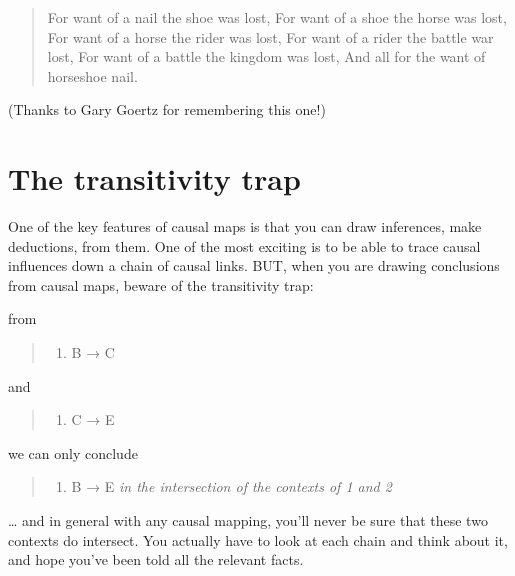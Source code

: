 \documentclass[
]{book}
\providecommand{\tightlist}{%
  \setlength{\itemsep}{0pt}\setlength{\parskip}{0pt}}
\begin{document}
\begin{quote}
For want of a nail the shoe was lost,
For want of a shoe the horse was lost,
For want of a horse the rider was lost,
For want of a rider the battle war lost,
For want of a battle the kingdom was lost,
And all for the want of horseshoe nail.
\end{quote}

(Thanks to Gary Goertz for remembering this one!)

\hypertarget{the-transitivity-trap}{%
\section{The transitivity trap}\label{the-transitivity-trap}}

One of the key features of causal maps is that you can draw inferences, make deductions, from them. One of the most exciting is to be able to trace causal influences down a chain of causal links. BUT, when you are drawing conclusions from causal maps, beware of the transitivity trap:

from

\begin{quote}
\begin{enumerate}
\def\labelenumi{\arabic{enumi})}
\tightlist
\item
  B → C
\end{enumerate}
\end{quote}

and

\begin{quote}
\begin{enumerate}
\def\labelenumi{\arabic{enumi})}
\setcounter{enumi}{1}
\tightlist
\item
  C → E
\end{enumerate}
\end{quote}

we can only conclude

\begin{quote}
\begin{enumerate}
\def\labelenumi{\arabic{enumi})}
\setcounter{enumi}{2}
\tightlist
\item
  B → E \emph{in the intersection of the contexts of 1 and 2}
\end{enumerate}
\end{quote}

\ldots{} and in general with any causal mapping, you'll never be sure that these two contexts do intersect. You actually have to look at each chain and think about it, and hope you've been told all the relevant facts.
\end{document}
